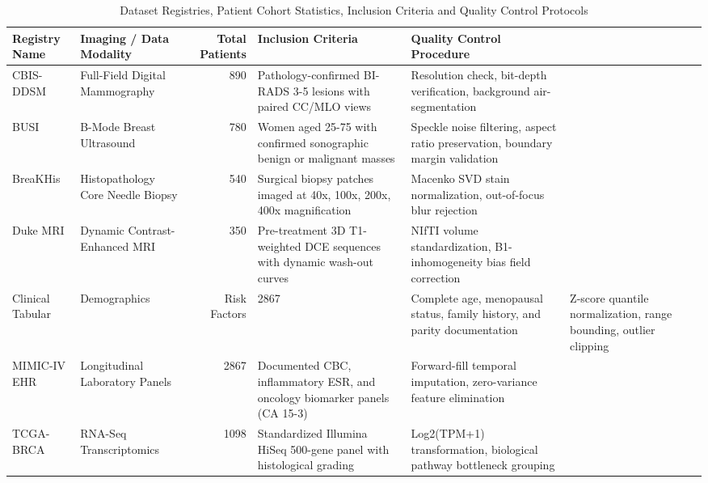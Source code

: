 \begin{table}
\caption{Dataset Registries, Patient Cohort Statistics, Inclusion Criteria and Quality Control Protocols}
\label{tab:supp_table_01_dataset_registry_cohort_statistics_and_inclusion_criteria}
\begin{tabular}{llrll}
\toprule
Registry Name & Imaging / Data Modality & Total Patients & Inclusion Criteria & Quality Control Procedure \\
\midrule
CBIS-DDSM & Full-Field Digital Mammography & 890 & Pathology-confirmed BI-RADS 3-5 lesions with paired CC/MLO views & Resolution check, bit-depth verification, background air-segmentation \\
BUSI & B-Mode Breast Ultrasound & 780 & Women aged 25-75 with confirmed sonographic benign or malignant masses & Speckle noise filtering, aspect ratio preservation, boundary margin validation \\
BreaKHis & Histopathology Core Needle Biopsy & 540 & Surgical biopsy patches imaged at 40x, 100x, 200x, 400x magnification & Macenko SVD stain normalization, out-of-focus blur rejection \\
Duke MRI & Dynamic Contrast-Enhanced MRI & 350 & Pre-treatment 3D T1-weighted DCE sequences with dynamic wash-out curves & NIfTI volume standardization, B1-inhomogeneity bias field correction \\
Clinical Tabular & Demographics & Risk Factors & 2867 & Complete age, menopausal status, family history, and parity documentation & Z-score quantile normalization, range bounding, outlier clipping \\
MIMIC-IV EHR & Longitudinal Laboratory Panels & 2867 & Documented CBC, inflammatory ESR, and oncology biomarker panels (CA 15-3) & Forward-fill temporal imputation, zero-variance feature elimination \\
TCGA-BRCA & RNA-Seq Transcriptomics & 1098 & Standardized Illumina HiSeq 500-gene panel with histological grading & Log2(TPM+1) transformation, biological pathway bottleneck grouping \\
\bottomrule
\end{tabular}
\end{table}
